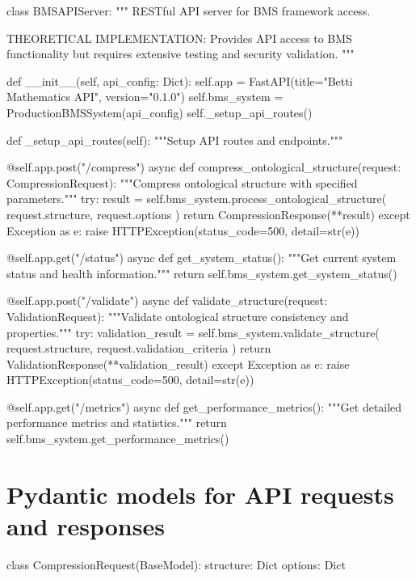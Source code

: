class BMSAPIServer:
    """
    RESTful API server for BMS framework access.
    
    THEORETICAL IMPLEMENTATION: Provides API access to BMS functionality
    but requires extensive testing and security validation.
    """
    
    def __init__(self, api_config: Dict):
        self.app = FastAPI(title="Betti Mathematics API", version="0.1.0")
        self.bms_system = ProductionBMSSystem(api_config)
        self._setup_api_routes()
        
    def _setup_api_routes(self):
        """Setup API routes and endpoints."""
        
        @self.app.post("/compress")
        async def compress_ontological_structure(request: CompressionRequest):
            """Compress ontological structure with specified parameters."""
            try:
                result = self.bms_system.process_ontological_structure(
                    request.structure, 
                    request.options
                )
                return CompressionResponse(**result)
            except Exception as e:
                raise HTTPException(status_code=500, detail=str(e))
        
        @self.app.get("/status")
        async def get_system_status():
            """Get current system status and health information."""
            return self.bms_system.get_system_status()
        
        @self.app.post("/validate")
        async def validate_structure(request: ValidationRequest):
            """Validate ontological structure consistency and properties."""
            try:
                validation_result = self.bms_system.validate_structure(
                    request.structure,
                    request.validation_criteria
                )
                return ValidationResponse(**validation_result)
            except Exception as e:
                raise HTTPException(status_code=500, detail=str(e))
        
        @self.app.get("/metrics")
        async def get_performance_metrics():
            """Get detailed performance metrics and statistics."""
            return self.bms_system.get_performance_metrics()

\chapter{Pydantic models for API requests and responses}
class CompressionRequest(BaseModel):
    structure: Dict
    options: Dict
    

